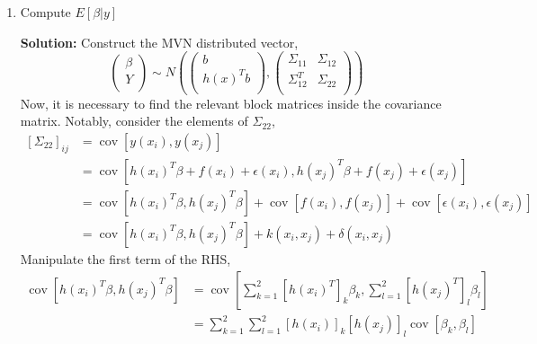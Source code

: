 \documentclass{article}[12pt]
\begin{document}
\begin{enumerate}
\item Compute $E[\beta|y]$
	
	\textbf{Solution: } Construct the MVN distributed vector,
	\begin{equation}
		\begin{pmatrix}
			\beta \\
			Y \\
		\end{pmatrix}
		\sim N\left( 
\begin{pmatrix}
	b \\
	h(x)^T b \\
\end{pmatrix},
\begin{pmatrix}
	\Sigma_{11} & \Sigma_{12} \\
	\Sigma^T_{12} & \Sigma_{22} \\
\end{pmatrix}
		\right)
	\end{equation}
	Now, it is necessary to find the relevant block matrices inside the covariance matrix. Notably, consider the elements of $\Sigma_{22}$,
	\begin{equation}
	\begin{aligned}
		\left[ \Sigma_{22} \right]_{ij} &= \operatorname{cov} \left[ y(x_i), y(x_j) \right] \\
						&=  \operatorname{cov} \left[ h(x_i)^T \beta + f(x_i) + \epsilon(x_i), h(x_j)^T \beta + f(x_j) + \epsilon(x_j) \right] \\
						&= \operatorname{cov} \left[ h(x_i)^T\beta, h(x_j)^T\beta \right] + \operatorname{cov} \left[ f(x_i), f(x_j) \right] + \operatorname{cov} \left[ \epsilon(x_i), \epsilon(x_j) \right]\\
						&= \operatorname{cov} \left[ h(x_i)^T\beta, h(x_j)^T\beta \right] + k(x_i, x_j) + \delta(x_i, x_j)  
	\end{aligned}
	\end{equation}
	Manipulate the first term of the RHS,
	\begin{equation}
		\begin{aligned}
			\operatorname{cov} \left[ h(x_i)^T \beta, h(x_j)^T \beta \right] &= \operatorname{cov} \left[ \sum^{2}_{k=1} \left[ h(x_i)^T \right]_k \beta_k, \sum^{2}_{l=1} \left[ h(x_j)^T \right]_l \beta_l   \right]\\
											 &= \sum^{2}_{k=1} \sum^{2}_{l=1} \left[ h(x_i) \right]_k \left[ h(x_j) \right]_l \operatorname{cov}\left[ \beta_k, \beta_l  \right] \\

\end{aligned}
\end{equation}
\end{enumerate}
\end{document}
